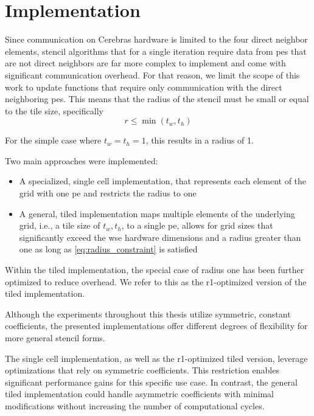 \chapter{Implementation}
\label{sec:implementation}
Since communication on Cerebras hardware is limited to the four direct neighbor elements, stencil algorithms that for a single iteration require data from \acp{pe} that are not direct neighbors are far more complex to implement and come with significant communication overhead. For that reason, we limit the scope of this work to update functions that require only communication with the direct neighboring \acp{pe}. This means that the radius of the stencil must be small or equal to the tile size, specifically
\begin{equation}    
\label{eq:radius_constraint}
r \leq \min(t_w, t_h)
\end{equation}

For the simple case where $t_w=t_h=1$, this results in a radius of 1.

Two main approaches were implemented:
\begin{itemize}
    \item A specialized, single cell implementation, that represents each element of the grid with one \ac{pe} and restricts the radius to one
    \item A general, tiled implementation maps multiple elements of the underlying grid, i.e., a tile size of $t_w, t_h$, to a single \ac{pe}, allows for grid sizes that significantly exceed the \ac{wse} hardware dimensions and a radius greater than one as long as \autoref{eq:radius_constraint} is satisfied 
\end{itemize}

Within the tiled implementation, the special case of radius one has been further optimized to reduce overhead. We refer to this as the r1-optimized version of the tiled implementation. 

Although the experiments throughout this thesis utilize symmetric, constant coefficients, the presented implementations offer different degrees of flexibility for more general stencil forms.

The single cell implementation, as well as the r1-optimized tiled version, leverage optimizations that rely on symmetric coefficients. This restriction enables significant performance gains for this specific use case. In contrast, the general tiled implementation could handle asymmetric coefficients with minimal modifications without increasing the number of computational cycles.

